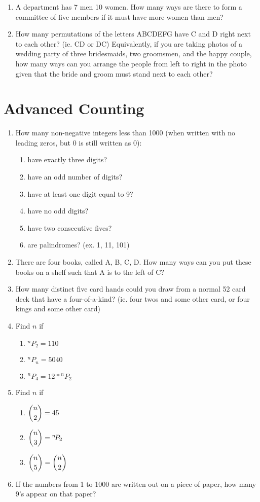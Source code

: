 \documentclass{article}
\newcommand*{\Perm}[2]{{}^{#1}\!P_{#2}}%
\begin{document}
\begin{enumerate}
\item A department has 7 men 10 women. How many ways are there to form a committee of five members if it must have more women than men?

\item How many permutations of the letters ABCDEFG have C and D right next to each other? (ie. CD or DC) Equivalently, if you are taking photos of a wedding party of three bridesmaids, two groomsmen, and the happy couple, how many ways can you arrange the people from left to right in the photo given that the bride and groom must stand next to each other?
\end{enumerate}


\section{Advanced Counting}
\begin{enumerate}
\item How many non-negative integers less than 1000 (when written with no leading zeros, but 0 is still written as 0):
  \begin{enumerate}
  \item have exactly three digits?
  \item have an odd number of digits?
  \item have at least one digit equal to 9?
  \item have no odd digits?
  \item have two consecutive fives?
  \item are palindromes? (ex. 1, 11, 101)
  \end{enumerate}

\item There are four books, called A, B, C, D. How many ways can you put these books on a shelf such that A is to the left of C?

\item How many distinct five card hands could you draw from a normal 52 card deck that have a four-of-a-kind? (ie. four twos and some other card, or four kings and some other card)

\item Find $n$ if
  \begin{enumerate}
  \item $\Perm{n}{2} = 110$
  \item $\Perm{n}{n} = 5040$
  \item $\Perm{n}{4} = 12 * \Perm{n}{2}$
  \end{enumerate}

\item Find $n$ if
  \begin{enumerate}
  \item $ \dbinom{n}{2} = 45$
  \item $ \dbinom{n}{3} = \Perm{n}{2}$
  \item $ \dbinom{n}{5}= \dbinom{n}{2}$
  \end{enumerate}

\item If the numbers from 1 to 1000 are written out on a piece of paper, how many 9's appear on that paper?
\end{enumerate}
\end{document}

